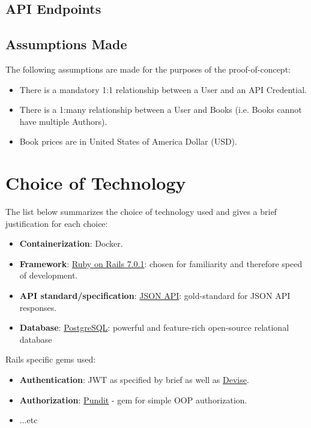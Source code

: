\documentclass[a4paper]{article}
\begin{document}
\subsection{API Endpoints}

\subsection{Assumptions Made}

The following assumptions are made for the purposes of the proof-of-concept:

\begin{itemize}
  \item There is a mandatory 1:1 relationship between a User and an API Credential.
  \item There is a 1:many relationship between a User and Books (i.e. Books cannot have multiple Authors).
  \item Book prices are in United States of America Dollar (USD).
\end{itemize}

\section{Choice of Technology}

The list below summarizes the choice of technology used and gives a brief
justification for each choice:

\begin{itemize}
  \item \textbf{Containerization}: Docker.
  \item \textbf{Framework}: \href{https://rubyonrails.org/}{Ruby on Rails 7.0.1}: chosen for familiarity and therefore speed of development.
  \item \textbf{API standard/specification}: \href{https://jsonapi.org/}{JSON API}: gold-standard for JSON API responses.
  \item \textbf{Database}: \href{https://www.postgresql.org/}{PostgreSQL}: powerful and feature-rich open-source relational database
\end{itemize}

Rails specific gems used:

\begin{itemize}
  \item \textbf{Authentication}: JWT as specified by brief as well as \href{https://github.com/heartcombo/devise}{Devise}.
  \item \textbf{Authorization}: \href{https://github.com/varvet/pundit}{Pundit} - gem for simple OOP authorization.
  \item ...etc
\end{itemize}
\end{document}
